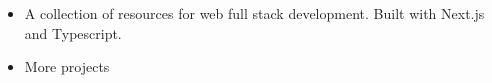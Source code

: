 \documentclass[]{rahulworld-resume}
\begin{document}
\begin{minipage}[t]{0.66\textwidth}
\begin{itemize}
    \item \href{https://github.com/jamerrq/resources-app}{} A collection of resources for web full stack development. Built with Next.js and Typescript.

    \item More projects \href{https://jamerrq-com.vercel.app/projects}{}

\end{itemize}

\end{minipage}
\end{document}

